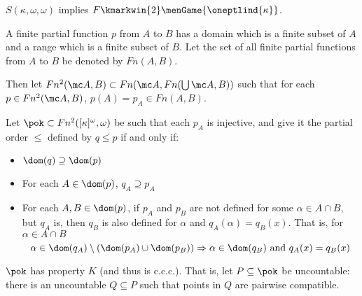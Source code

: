   \begin{cor}
    $S(\kappa,\omega,\omega)$ implies $F\kmarkwin{2}\menGame{\oneptlind{\kappa}}$.
  \end{cor}

  \begin{defn}
    A finite partial function $p$ from $A$ to $B$ has a domain which is a finite subset of $A$ and a range which is a finite subset of $B$. Let the set of all finite partial functions from $A$ to $B$ be denoted by $Fn(A,B)$.

    Then let $Fn^2(\mc A,B)\subset Fn(\mc A,Fn(\bigcup \mc A,B))$ such that for each $p\in Fn^2(\mc A,B)$, $p(A)=p_A\in Fn(A,B)$.
  \end{defn}

  \begin{defn}
    Let $\pok\subset Fn^2([\kappa]^\omega,\omega)$ be such that each $p_A$ is injective, and give it the partial order $\leq$ defined by $q\leq p$ if and only if:
          \begin{itemize}
            \item $\dom(q)\supseteq\dom(p)$
            \item For each $A\in\dom(p)$, $q_A\supseteq p_A$
            \item For each $A,B\in\dom(p)$, if $p_A$ and $p_B$ are not defined for some $\alpha\in A\cap B$, but $q_A$ is, then $q_B$ is also defined for $\alpha$ and $q_A(\alpha)=q_B(x)$. That is, for $\alpha\in A\cap B$
              \[
                \alpha\in\dom(q_A)\setminus(\dom(p_A)\cup\dom(p_B))
                \Rightarrow
                \alpha\in\dom(q_B) \text{ and } q_A(x)=q_B(x)
              \]
          \end{itemize}
  \end{defn}

  \begin{lem}
    $\pok$ has property $K$ (and thus is c.c.c.). That is, let $P\subseteq\pok$ be uncountable: there is an uncountable $Q\subseteq P$ such that points in $Q$ are pairwise compatible.
  \end{lem}

